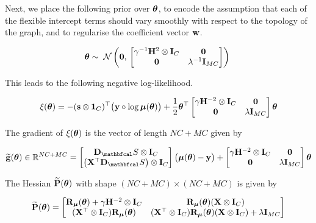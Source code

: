 Next, we place the following prior over $\boldsymbol{\theta}$, to encode the assumption that each of the flexible intercept terms should vary smoothly with respect to the topology of the graph, and to regularise the coefficient vector $\mathbf{w}$. 

\begin{equation}
    \boldsymbol{\theta} \sim \; \mathcal{N}\left(\mathbf{0}, \, \begin{bmatrix}\gamma^{-1} \mathbf{H}^2 \otimes \mathbf{I}_C & \mathbf{0} \\
    \mathbf{0} & \lambda^{-1} \mathbf{I}_{MC} \end{bmatrix}\right) \;
\end{equation}


This leads to the following negative log-likelihood. 

\begin{equation}
    \xi(\boldsymbol{\theta}) = - (\mathbf{s} \otimes \mathbf{1}_C)^\top \big(\mathbf{y} \circ \log \boldsymbol{\mu}(\boldsymbol{\theta}) \big) + \frac{1}{2} \boldsymbol{\theta}^\top \begin{bmatrix}\gamma \mathbf{H}^{-2} \otimes \mathbf{I}_C & \mathbf{0} \\
        \mathbf{0} & \lambda \mathbf{I}_{MC} \end{bmatrix} \boldsymbol{\theta}
\end{equation}

The gradient of $\xi(\boldsymbol{\theta})$ is the vector of length $NC + MC$ given by 

\begin{equation}
    \widetilde{\g}(\thetaa) \in \R^{NC + MC} = \begin{bmatrix}
        \D_\St \otimes \I_C \\ \left(\X^\top \D_\St\right) \otimes \I_C
    \end{bmatrix} \big(\muu(\thetaa) - \y\big) + \begin{bmatrix}
        \gamma \HH^{-2} \otimes \I_C & \zero \\
    \zero & \lambda \I_{MC}
    \end{bmatrix} \thetaa
\end{equation}

The Hessian $\widetilde{\mathbf{P}}(\boldsymbol{\theta})$ with shape $(NC + MC) \times (NC + MC)$  is given by


\begin{equation}
    \widetilde{\mathbf{P}}(\boldsymbol{\theta}) = \begin{bmatrix}
        \mathbf{R}_{\boldsymbol{\mu}}(\boldsymbol{\theta}) + \gamma \mathbf{H}^{-2} \otimes \mathbf{I}_C & \mathbf{R}_{\boldsymbol{\mu}}(\boldsymbol{\theta}) (\mathbf{X} \otimes \mathbf{I}_C) \\ 
        (\mathbf{X}^\top \otimes \mathbf{I}_C) \mathbf{R}_{\boldsymbol{\mu}}(\boldsymbol{\theta})  & (\mathbf{X}^\top \otimes \mathbf{I}_C) \mathbf{R}_{\boldsymbol{\mu}}(\boldsymbol{\theta}) (\mathbf{X} \otimes \mathbf{I}_C) + \lambda \mathbf{I}_{MC}
    \end{bmatrix}
\end{equation}

